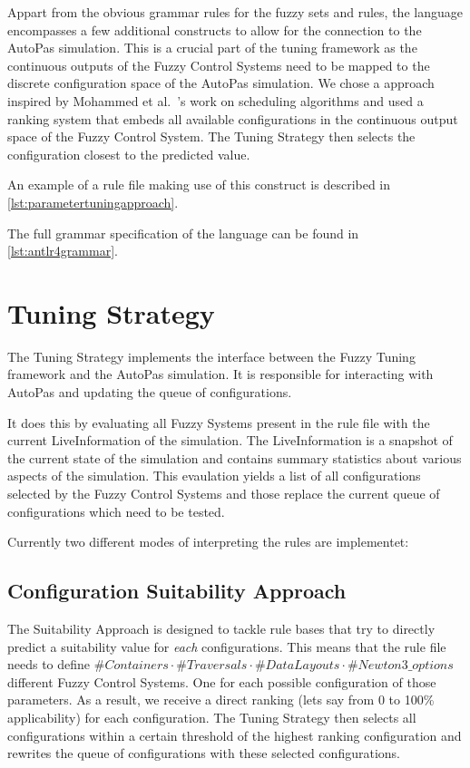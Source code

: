 Appart from the obvious grammar rules for the fuzzy sets and rules, the language encompasses a few additional constructs to allow for the connection to the AutoPas simulation. This is a crucial part of the tuning framework as the continuous outputs of the Fuzzy Control Systems need to be mapped to the discrete configuration space of the AutoPas simulation. We chose a approach inspired by Mohammed
et al.~\cite{Mohammed2022}'s work on scheduling algorithms and used a ranking system that embeds all available configurations in the continuous output space of the Fuzzy Control System. The Tuning Strategy then selects the configuration closest to the predicted value.


An example of a rule file making use of this construct is described in \autoref{lst:parametertuningapproach}.

The full grammar specification of the language can be found in \autoref{lst:antlr4grammar}.

\section{Tuning Strategy}

The Tuning Strategy implements the interface between the Fuzzy Tuning framework and the AutoPas simulation. It is responsible for interacting with AutoPas and updating the queue of configurations.

It does this by evaluating all Fuzzy Systems present in the rule file with the current LiveInformation of the simulation. The LiveInformation is a snapshot of the current state of the simulation and contains summary statistics about various aspects of the simulation. This evaulation yields a list of all configurations selected by the Fuzzy Control Systems and those replace the current queue of configurations which need to be tested.


Currently two different modes of interpreting the rules are implementet:

\subsection{Configuration Suitability Approach}

The Suitability Approach is designed to tackle rule bases that try to directly predict a suitability value for \emph{each} configurations. This means that the rule file needs to define $\#Containers \cdot \#Traversals \cdot \#DataLayouts \cdot \#Newton3\_options$ different Fuzzy Control Systems. One for each possible configuration of those parameters. As a result, we receive a direct ranking (lets say from 0 to 100\% applicability) for each configuration. The Tuning Strategy then selects all configurations within a certain threshold of the highest ranking configuration and rewrites the queue of configurations with these selected configurations.


